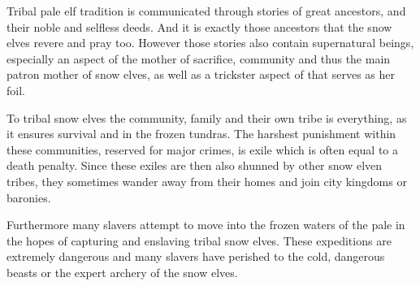 Tribal pale elf tradition is communicated through stories of great ancestors,
and their noble and selfless deeds. And it is exactly those ancestors that the
snow elves revere and pray too. However those stories also contain
supernatural beings, especially an aspect of  the mother
of sacrifice, community and thus the main patron mother of snow elves, as well
as a trickster aspect of  that serves as her foil.

To tribal snow elves the community, family and their own tribe is everything, as
it ensures survival and in the frozen tundras. The harshest punishment within
these communities, reserved for major crimes, is exile which is often equal to
a death penalty. Since these exiles are then also shunned by other snow elven
tribes, they sometimes wander away from their homes and join city kingdoms or
baronies.

Furthermore many slavers attempt to move into the frozen waters of the pale
in the hopes of capturing and enslaving tribal snow elves. These expeditions
are extremely dangerous and many slavers have perished to the cold, dangerous
beasts or the expert archery of the snow elves.
